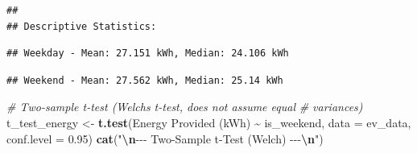 \documentclass[
  12pt,
]{article}
\newenvironment{Shaded}{\begin{snugshade}}{\end{snugshade}}
\newcommand{\AttributeTok}[1]{\textcolor[rgb]{0.13,0.29,0.53}{#1}}
\newcommand{\CommentTok}[1]{\textcolor[rgb]{0.56,0.35,0.01}{\textit{#1}}}
\newcommand{\DecValTok}[1]{\textcolor[rgb]{0.00,0.00,0.81}{#1}}
\newcommand{\FloatTok}[1]{\textcolor[rgb]{0.00,0.00,0.81}{#1}}
\newcommand{\FunctionTok}[1]{\textcolor[rgb]{0.13,0.29,0.53}{\textbf{#1}}}
\newcommand{\NormalTok}[1]{#1}
\newcommand{\OtherTok}[1]{\textcolor[rgb]{0.56,0.35,0.01}{#1}}
\newcommand{\SpecialCharTok}[1]{\textcolor[rgb]{0.81,0.36,0.00}{\textbf{#1}}}
\newcommand{\StringTok}[1]{\textcolor[rgb]{0.31,0.60,0.02}{#1}}
\begin{document}
\begin{verbatim}
## 
## Descriptive Statistics:
\end{verbatim}

\begin{Shaded}
\end{Shaded}

\begin{verbatim}
## Weekday - Mean: 27.151 kWh, Median: 24.106 kWh
\end{verbatim}

\begin{Shaded}
\end{Shaded}

\begin{verbatim}
## Weekend - Mean: 27.562 kWh, Median: 25.14 kWh
\end{verbatim}

\begin{Shaded}
\begin{Highlighting}[]
\CommentTok{\# Two{-}sample t{-}test (Welch\textquotesingle{}s t{-}test, does not assume equal}
\CommentTok{\# variances)}
\NormalTok{t\_test\_energy }\OtherTok{\textless{}{-}} \FunctionTok{t.test}\NormalTok{(}\StringTok{\textasciigrave{}}\AttributeTok{Energy Provided (kWh)}\StringTok{\textasciigrave{}} \SpecialCharTok{\textasciitilde{}}\NormalTok{ is\_weekend,}
    \AttributeTok{data =}\NormalTok{ ev\_data, }\AttributeTok{conf.level =} \FloatTok{0.95}\NormalTok{)}
\FunctionTok{cat}\NormalTok{(}\StringTok{"}\SpecialCharTok{\textbackslash{}n}\StringTok{{-}{-}{-} Two{-}Sample t{-}Test (Welch) {-}{-}{-}}\SpecialCharTok{\textbackslash{}n}\StringTok{"}\NormalTok{)}
\end{Highlighting}
\end{Shaded}
\end{document}
